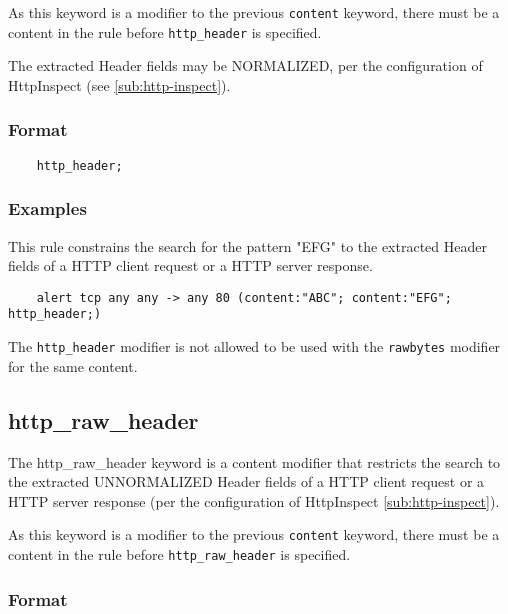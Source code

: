 \documentclass[english]{report}
\newenvironment{note}{
\samepage
    \vspace{10pt}{\textsf{
        {\hspace{7pt}\Huge{$\triangle$\hspace{-12.5pt}{\Large{$^!$}}}}\hspace{5pt}
        {\Large{NOTE}}
    }
    }
   \begin{center}
    \par\vspace{-17pt}

    \begin{lrbox}{\savepar}
    \begin{minipage}[r]{6in}
}
{
    \end{minipage}
    \end{lrbox}
    \fbox{
        \usebox{
            \savepar
	}
    }
    \par\vskip10pt
    \end{center}
}
\newenvironment{note}{
        \begin{rawhtml}
        <p><table border="1"><tr><td><b>
        Note:&nbsp;&nbsp;</b>
        \end{rawhtml}
}{
        \begin{rawhtml}
        </b></td></tr></table></p>
        \end{rawhtml}
}
\begin{document}
As this keyword is a modifier to the previous \texttt{content} keyword, there must be
a content in the rule before \texttt{http\_header} is specified.

The extracted Header fields may be NORMALIZED, per the configuration of
HttpInspect (see \ref{sub:http-inspect}).

\subsubsection{Format}

\begin{verbatim}
    http_header;
\end{verbatim}

\subsubsection{Examples}

This rule constrains the search for the pattern "EFG" to the extracted Header
fields of a HTTP client request or a HTTP server response.

\begin{verbatim}
    alert tcp any any -> any 80 (content:"ABC"; content:"EFG"; http_header;)
\end{verbatim}

\begin{note}

The \texttt{http\_header} modifier is not allowed to be used with the
\texttt{rawbytes} modifier for the same content.

\end{note}

\subsection{http\_raw\_header}
\label{sub:RawHttpHeader}

The http\_raw\_header keyword is a content modifier that restricts the search to the
extracted UNNORMALIZED Header fields of a HTTP client request or a HTTP server
response (per the configuration of HttpInspect \ref{sub:http-inspect}).

As this keyword is a modifier to the previous \texttt{content} keyword, there must be
a content in the rule before \texttt{http\_raw\_header} is specified.

\subsubsection{Format}
\end{document}
